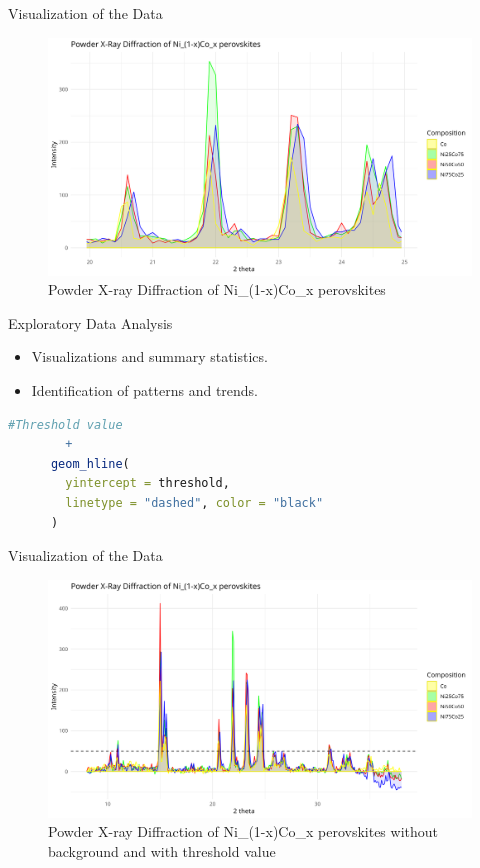 \documentclass[aspectratio=169]{beamer}
\begin{document}
\begin{frame}{Visualization of the Data}
    \begin{figure}
        \centering
        \includegraphics[width=1\textwidth]{../plot/graph_nb_zoom.png}
        \caption{Powder X-ray Diffraction of Ni\_(1-x)Co\_x perovskites}
        \label{fig:xrd}
    \end{figure}
\end{frame}

\begin{frame}[fragile]{Exploratory Data Analysis}
    \begin{itemize}
        \item Visualizations and summary statistics.
        \item Identification of patterns and trends.
    \end{itemize}

    \begin{lstlisting}[language=R, basicstyle=\tiny\ttfamily]
      #Threshold value
        +
      geom_hline(
        yintercept = threshold,
        linetype = "dashed", color = "black"
      )
    \end{lstlisting}
\end{frame}

\begin{frame}{Visualization of the Data}
    \begin{figure}
        \centering
        \includegraphics[width=1\textwidth]{../plot/graph.png}
        \caption{Powder X-ray Diffraction of Ni\_(1-x)Co\_x perovskites without background and with threshold value}
        \label{fig:xrd}
    \end{figure}
\end{frame}
\end{document}
